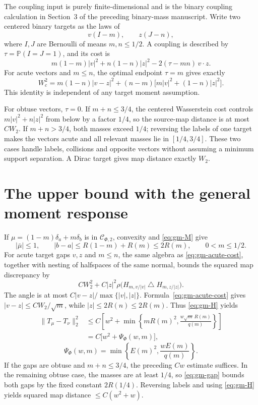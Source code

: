 The coupling input is purely finite-dimensional and is the binary coupling calculation in Section~3 of the preceding binary-mass manuscript. Write two centered binary targets as the laws of
\[
 v(I-m),\qquad z(J-n),
\]
where \(I,J\) are Bernoulli of means \(m,n\le1/2\). A coupling is described by \(\tau=\mathbb P(I=J=1)\), and its cost is
\begin{equation}
 m(1-m)|v|^2+n(1-n)|z|^2-2(\tau-mn)\,v\cdot z.
 \tag{2.1}\label{eq:gm-coupling-cost}
\end{equation}
For acute vectors and \(m\le n\), the optimal endpoint \(\tau=m\) gives exactly
\begin{equation}
 W_c^2=m(1-n)|v-z|^2
       +(n-m)\bigl[m|v|^2+(1-n)|z|^2\bigr].
 \tag{2.2}\label{eq:gm-acute-cost}
\end{equation}
This identity is independent of any target moment assumption.

For obtuse vectors, \(\tau=0\). If \(m+n\le3/4\), the centered Wasserstein cost controls \(m|v|^2+n|z|^2\) from below by a factor \(1/4\), so the source-map distance is at most \(CW_2\). If \(m+n>3/4\), both masses exceed \(1/4\); reversing the labels of one target makes the vectors acute and all relevant masses lie in \([1/4,3/4]\). These two cases handle labels, collisions and opposite vectors without assuming a minimum support separation. A Dirac target gives map distance exactly \(W_2\).

\section{The upper bound with the general moment response}\label{sec:gm-upper}

If \(\mu=(1-m)\delta_a+m\delta_b\) is in \(\mathcal C_{\Phi,2}\), convexity and \eqref{eq:gm-M} give
\begin{equation}
 |\bar\mu|\le1,\qquad
 |b-a|\le R(1-m)+R(m)\le2R(m),\qquad 0<m\le1/2.
 \tag{3.1}\label{eq:gm-gap}
\end{equation}
For acute target gaps \(v,z\) and \(m\le n\), the same algebra as \eqref{eq:gm-acute-cost}, together with nesting of halfspaces of the same normal, bounds the squared map discrepancy by
\[
 CW_2^2+C|z|^2\rho\bigl(H_{m,v/|v|}\mathbin{\triangle}H_{m,z/|z|}\bigr).
\]
The angle is at most \(C|v-z|/\max\{|v|,|z|\}\). Formula~\eqref{eq:gm-acute-cost} gives \(|v-z|\le CW_2/\sqrt m\), while \(|z|\le2R(n)\le2R(m)\). Thus \eqref{eq:gm-H} yields
\begin{equation}
 \begin{aligned}
 \|T_\mu-T_\nu\|_2^2
 &\le C\left[w^2+\min\left\{mR(m)^2,
                 \frac{w\sqrt m\,R(m)}{q(m)}\right\}\right]\\
 &=C\bigl[w^2+\Psi_\Phi(w,m)\bigr],
 \end{aligned}
 \tag{3.2}\label{eq:gm-upper-bound}
\end{equation}
\[
 \Psi_\Phi(w,m)=\min\left\{E(m)^2,\frac{wE(m)}{q(m)}\right\}.
\]
If the gaps are obtuse and \(m+n\le3/4\), the preceding \(Cw\) estimate suffices. In the remaining obtuse case, the masses are at least \(1/4\), so \eqref{eq:gm-gap} bounds both gaps by the fixed constant \(2R(1/4)\). Reversing labels and using \eqref{eq:gm-H} yields squared map distance \(\le C(w^2+w)\).

